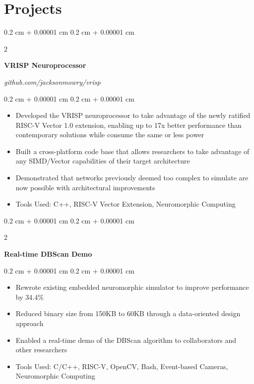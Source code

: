 \documentclass[10pt, letterpaper]{article}
\newenvironment{highlights}{
    \begin{itemize}[
        topsep=0.10 cm,
        parsep=0.10 cm,
        partopsep=0pt,
        itemsep=0pt,
        leftmargin=0.4 cm + 10pt
    ]
}{
    \end{itemize}
} %
\newenvironment{onecolentry}{
    \begin{adjustwidth}{
        0.2 cm + 0.00001 cm
    }{
        0.2 cm + 0.00001 cm
    }
}{
    \end{adjustwidth}
} %
\newenvironment{twocolentry}[2][]{
    \onecolentry
    \def\secondColumn{#2}
    \setcolumnwidth{\fill, 4.5 cm}
    \begin{paracol}{2}
}{
    \switchcolumn \raggedleft \secondColumn
    \end{paracol}
    \endonecolentry
} %
\begin{document}
    \section{Projects}

        \begin{twocolentry}{
        \textit{\footnotesize{github.com/jacksonmowry/vrisp}}}
        \textbf{VRISP Neuroprocessor}
        \end{twocolentry}

        \vspace{0.10 cm}
        \begin{onecolentry}
            \begin{highlights}
                \item Developed the VRISP neuroprocessor to take advantage of the newly ratified RISC-V Vector 1.0 extension, enabling up to 17x better performance than contemporary solutions while consume the same or less power
                \item Built a cross-platform code base that allows researchers to take advantage of any SIMD/Vector capabilities of their target architecture
                \item Demonstrated that networks previously deemed too complex to simulate are now possible with architectural improvements
                \item Tools Used: C++, RISC-V Vector Extension, Neuromorphic Computing
            \end{highlights}
        \end{onecolentry}


        \vspace{0.2 cm}

        \begin{twocolentry}{


        }
            \textbf{Real-time DBScan Demo}
        \end{twocolentry}

        \vspace{0.10 cm}
        \begin{onecolentry}
            \begin{highlights}
                \item Rewrote existing embedded neuromorphic simulator to improve performance by 34.4\%
                \item Reduced binary size from 150KB to 60KB through a data-oriented design approach
                \item Enabled a real-time demo of the DBScan algorithm to collaborators and other researchers
                \item Tools Used: C/C++, RISC-V, OpenCV, Bash, Event-based Cameras, Neuromorphic Computing
            \end{highlights}
        \end{onecolentry}
\end{document}

